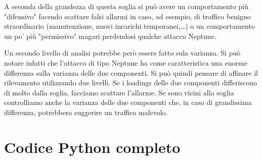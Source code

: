 \documentclass[12pt]{article}
\begin{document}
			A seconda della grandezza di questa soglia si può avere un comportamento più "difensivo" facendo scattare falsi allarmi in caso, ad esempio, di traffico benigno straordinario (manutenzione, nuovi incarichi temporanei,\dots ) o un comportamento un po' più "permissivo" magari perdendosi qualche attacco Neptune.
			
			Un secondo livello di analisi potrebbe però essere fatto sula varianza. Si può notare infatti che l'attacco di tipo Neptune ha come caratteristica una enorme differenza sulla varianza delle due componenti. Si può quindi pensare di affinare il rilevamento utilizzando due livelli. Se i loadings delle due componenti differiscono di molto dalla soglia, facciamo scattare l'allarme. Se sono vicini alla soglia controlliamo anche la varianza delle due componenti che, in caso di grandissima differenza, potrebbero suggerire un traffico malevolo.
					
			\newpage

\section{Codice Python completo}
	
	\newpage
	
	\newpage
	



\end{document}
